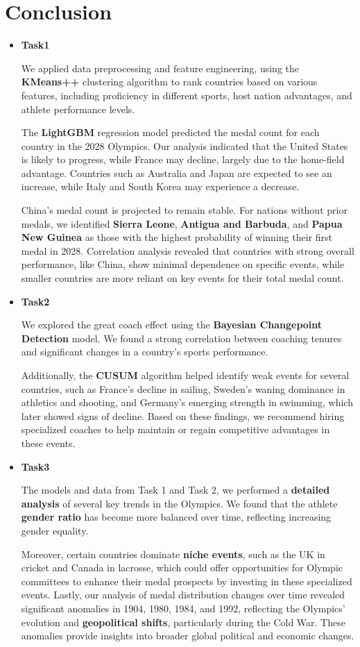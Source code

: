 \documentclass[12pt]{article}  %
\begin{document}
\section{Conclusion}
\begin{itemize}
		\item \textbf{Task1}
		

We applied data preprocessing and feature engineering, using the \textbf{KMeans++} clustering algorithm to rank countries based on various features, including proficiency in different sports, host nation advantages, and athlete performance levels.

The \textbf{LightGBM} regression model predicted the medal count for each country in the 2028 Olympics. Our analysis indicated that the United States is likely to progress, while France may decline, largely due to the home-field advantage. Countries such as Australia and Japan are expected to see an increase, while Italy and South Korea may experience a decrease.

China's medal count is projected to remain stable. For nations without prior medals, we identified \textbf{Sierra Leone}, \textbf{Antigua and Barbuda}, and \textbf{Papua New Guinea} as those with the highest probability of winning their first medal in 2028. Correlation analysis revealed that countries with strong overall performance, like China, show minimal dependence on specific events, while smaller countries are more reliant on key events for their total medal count.
	

	\item \textbf{Task2}

We explored the great coach effect using the \textbf{Bayesian Changepoint Detection} model. We found a strong correlation between coaching tenures and significant changes in a country’s sports performance.
 
Additionally, the \textbf{CUSUM} algorithm helped identify weak events for several countries, such as France’s decline in sailing, Sweden’s waning dominance in athletics and shooting, and Germany’s emerging strength in swimming, which later showed signs of decline. Based on these findings, we recommend hiring specialized coaches to help maintain or regain competitive advantages in these events.
	\item \textbf{Task3}
	
The models and data from Task 1 and Task 2, we performed a \textbf{detailed analysis} of several key trends in the Olympics. We found that the athlete \textbf{gender ratio} has become more balanced over time, reflecting increasing gender equality.
 
Moreover, certain countries dominate \textbf{niche events}, such as the UK in cricket and Canada in lacrosse, which could offer opportunities for Olympic committees to enhance their medal prospects by investing in these specialized events. Lastly, our analysis of medal distribution changes over time revealed significant anomalies in 1904, 1980, 1984, and 1992, reflecting the Olympics' evolution and \textbf{geopolitical shifts}, particularly during the Cold War. These anomalies provide insights into broader global political and economic changes.
\end{itemize}
\end{document}
